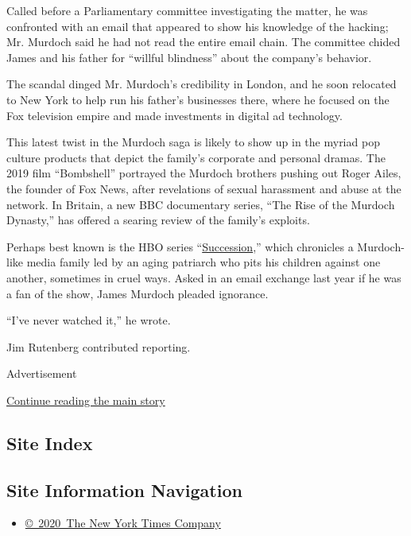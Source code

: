 Called before a Parliamentary committee investigating the matter, he was
confronted with an email that appeared to show his knowledge of the
hacking; Mr. Murdoch said he had not read the entire email chain. The
committee chided James and his father for ``willful blindness'' about
the company's behavior.

The scandal dinged Mr. Murdoch's credibility in London, and he soon
relocated to New York to help run his father's businesses there, where
he focused on the Fox television empire and made investments in digital
ad technology.

This latest twist in the Murdoch saga is likely to show up in the myriad
pop culture products that depict the family's corporate and personal
dramas. The 2019 film ``Bombshell'' portrayed the Murdoch brothers
pushing out Roger Ailes, the founder of Fox News, after revelations of
sexual harassment and abuse at the network. In Britain, a new BBC
documentary series, ``The Rise of the Murdoch Dynasty,'' has offered a
searing review of the family's exploits.

Perhaps best known is the HBO series
``\href{https://www.nytimes3xbfgragh.onion/2019/08/04/business/media/hbo-succession-business.html}{Succession},''
which chronicles a Murdoch-like media family led by an aging patriarch
who pits his children against one another, sometimes in cruel ways.
Asked in an email exchange last year if he was a fan of the show, James
Murdoch pleaded ignorance.

``I've never watched it,'' he wrote.

Jim Rutenberg contributed reporting.

Advertisement

\protect\hyperlink{after-bottom}{Continue reading the main story}

\hypertarget{site-index}{%
\subsection{Site Index}\label{site-index}}

\hypertarget{site-information-navigation}{%
\subsection{Site Information
Navigation}\label{site-information-navigation}}

\begin{itemize}
\tightlist
\item
  \href{https://help.nytimes3xbfgragh.onion/hc/en-us/articles/115014792127-Copyright-notice}{©~2020~The
  New York Times Company}
\end{itemize}

